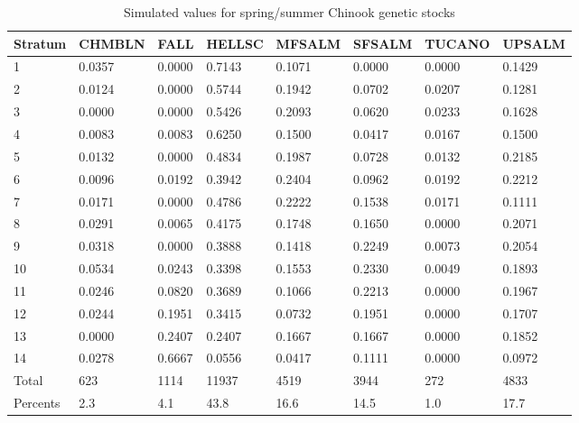 \documentclass[12pt]{article}
\begin{document}
\begin{table}
\caption{Simulated values for spring/summer Chinook genetic stocks}
\label{table:CHsimO} 
\begin{center}
\begin{tabular}{|l|l|l|l|l|l|l|l|}
\hline Stratum&CHMBLN&FALL&HELLSC&MFSALM&SFSALM&TUCANO&UPSALM \\ \hline
1&0.0357&0.0000&0.7143&0.1071&0.0000&0.0000&0.1429 \\ \hline
2&0.0124&0.0000&0.5744&0.1942&0.0702&0.0207&0.1281 \\ \hline
3&0.0000&0.0000&0.5426&0.2093&0.0620&0.0233&0.1628 \\ \hline
4&0.0083&0.0083&0.6250&0.1500&0.0417&0.0167&0.1500 \\ \hline
5&0.0132&0.0000&0.4834&0.1987&0.0728&0.0132&0.2185 \\ \hline
6&0.0096&0.0192&0.3942&0.2404&0.0962&0.0192&0.2212 \\ \hline
7&0.0171&0.0000&0.4786&0.2222&0.1538&0.0171&0.1111 \\ \hline
8&0.0291&0.0065&0.4175&0.1748&0.1650&0.0000&0.2071 \\ \hline
9&0.0318&0.0000&0.3888&0.1418&0.2249&0.0073&0.2054 \\ \hline
10&0.0534&0.0243&0.3398&0.1553&0.2330&0.0049&0.1893 \\ \hline
11&0.0246&0.0820&0.3689&0.1066&0.2213&0.0000&0.1967 \\ \hline
12&0.0244&0.1951&0.3415&0.0732&0.1951&0.0000&0.1707 \\ \hline
13&0.0000&0.2407&0.2407&0.1667&0.1667&0.0000&0.1852 \\ \hline
14&0.0278&0.6667&0.0556&0.0417&0.1111&0.0000&0.0972 \\ \hline
Total&623&1114&11937&4519&3944&272&4833 \\ \hline
Percents&2.3&4.1&43.8&16.6&14.5&1.0&17.7 \\ \hline
\end{tabular}
\end{center}
\end{table}
\end{document}
